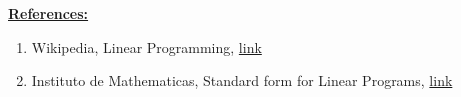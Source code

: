 \documentclass[12pt]{article}
\begin{document}
\begin{enumerate}[1.]
\begin{itemize}
    \end{itemize}

    \bigskip

    \underline{\textbf{References:}}

    \bigskip

    \begin{enumerate}[1)]
        \item Wikipedia, Linear Programming, \href{https://en.wikipedia.org/wiki/Linear_programming}{link}
        \item Instituto de Mathematicas, Standard form for Linear Programs, \href{https://www.matem.unam.mx/~omar/math340/std-form.html}{link}
    \end{enumerate}
\end{enumerate}
\end{document}

